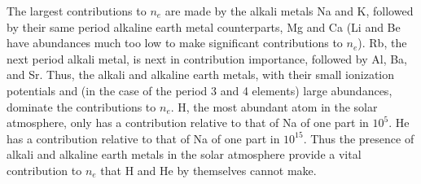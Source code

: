 The largest contributions to $n_e$ are made by the alkali metals Na
and K, followed by their same period alkaline earth metal counterparts,
Mg and Ca  (Li and Be have abundances much too low to make
significant contributions to $n_e$).  Rb, the next period alkali
metal, is next in contribution importance, followed by Al, Ba, and
Sr.  Thus, the alkali and alkaline earth metals, with their small
ionization potentials and (in the case of the period 3 and 4 elements)
large abundances, dominate the contributions to $n_e$.  H, the most
abundant atom in the solar atmosphere, only has a contribution
relative to that of Na of one part in $10^5$.  He has a contribution
relative to that of Na of one part in $10^{15}$.  Thus the presence of
alkali and alkaline earth metals in the solar atmosphere provide a
vital contribution to $n_e$ that H and He by themselves cannot make.


